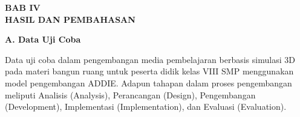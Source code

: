 \newpage
\begin{center}
    \textbf{BAB IV} \\
    \textbf{HASIL DAN PEMBAHASAN}
\end{center}

\textbf{A. Data Uji Coba}

\hspace*{1cm}Data uji coba dalam pengembangan media pembelajaran berbasis simulasi 3D pada materi bangun ruang untuk peserta didik kelas VIII SMP menggunakan model pengembangan ADDIE. Adapun tahapan dalam proses pengembangan meliputi Analisis (Analysis), Perancangan (Design), Pengembangan (Development), Implementasi (Implementation), dan Evaluasi (Evaluation).

